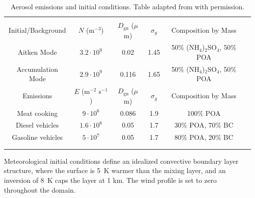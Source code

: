 \documentclass[journal abbreviation, manuscript]{copernicus}
\begin{document}
\begin{table}[!t]
\centering
\caption{Aerosol emissions and initial conditions. Table adapted from \citet{riemer_simulating_2009} with permission.}
\begin{tabular*}{\linewidth}{@{\extracolsep{\fill}} cccccc}
\\[-2ex]\hline 
     \hline \\[-2ex] Initial/Background  & $N$ (m$^{-3}$) & $D_{\text{gn}}$ ($\mu$m) & $\sigma_g$ & Composition by Mass\\
 \midrule
Aitken Mode & $3.2 \cdot 10^9$ & 0.02 & 1.45 & 50\% (NH$_4$)$_2$SO$_4$, 50\% POA\\
Accumulation Mode & $2.9 \cdot 10^9$ & 0.116 & 1.65 & 50\% (NH$_4$)$_2$SO$_4$, 50\% POA\\
\midrule
Emissions & $E$ (m$^{-2}$ s$^{-1}$) & $D_{\text{gn}}$ ($\mu$m) & $\sigma_g$ & Composition by Mass\\
\midrule
Meat cooking & $9 \cdot 10^6$ & 0.086 & 1.9 & 100\% POA\\
Diesel vehicles & $1.6 \cdot 10^8$ & 0.05 & 1.7 & 30\% POA, 70\% BC \\
Gasoline vehicles & $5 \cdot 10^7$ & 0.05 & 1.7 & 80\% POA, 20\% BC \\
\\[-2ex]\hline 
     \hline \\[-2ex]
\end{tabular*}
\label{table:aero_emiss_ics}
\end{table}

Meteorological initial conditions define an idealized
convective boundary layer structure, where the surface is 5~K warmer
than the mixing layer, and an inversion of 8~K caps the layer at 1
km. The wind profile is set to zero throughout the domain.

\end{document}
